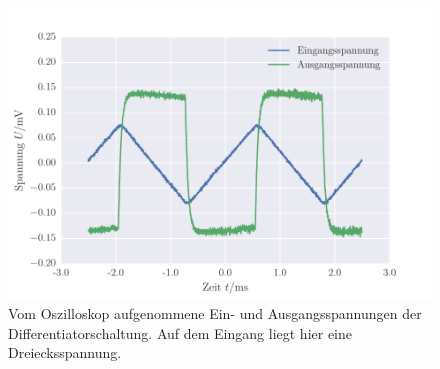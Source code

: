 \FloatBarrier
\begin{figure}[!h]
\centering
\includegraphics[scale=0.75]{../Grafiken/Differentiator_Oszilloskop_Dreieck.pdf}
\caption{Vom Oszilloskop aufgenommene Ein- und Ausgangsspannungen der Differentiatorschaltung. Auf dem Eingang
	liegt hier eine Dreiecksspannung.\label{fig:differentiator_oszilloskop_dreieck}}
\end{figure}
\FloatBarrier